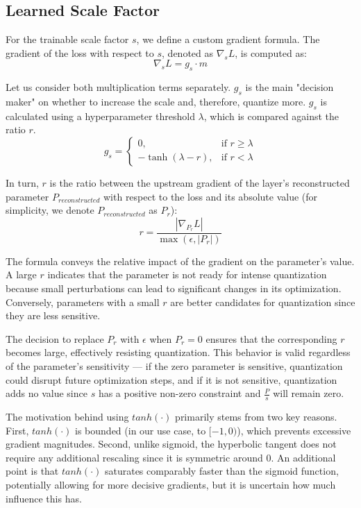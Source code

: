 \subsection{Learned Scale Factor}
\label{subsec:learnedscalefactor}

\hspace*{1em}For the trainable scale factor \( s \), we define a custom gradient formula. 
The gradient of the loss with respect to \( s \), denoted as \( \nabla_s L \), is computed as:
\[
\nabla_s L = g_s \cdot m
\]

Let us consider both multiplication terms separately. \(  g_s  \) is the main "decision maker" on whether to
increase the scale and, therefore, quantize more. \(  g_s  \) is
calculated using a hyperparameter threshold  \(  \lambda  \),
which is compared against the ratio \(  r  \).
\[
g_s = 
\begin{cases} 
0, & \text{if } r \geq \lambda \\
- \tanh(\lambda - r), & \text{if } r < \lambda
\end{cases}
\]

In turn, \(  r  \) is the ratio between the upstream gradient of the layer's reconstructed parameter \( P_{reconstructed}\) 
with respect to the loss
and its absolute value (for simplicity, we denote \( P_{reconstructed}\) as \(P_r\)):
\[
r = \frac{\left| \nabla_{P_{r}} L \right|}{\max(\epsilon, \left| P_r \right|)}
\]

The formula conveys the relative impact of the gradient on the parameter's value.
A large \(  r  \) indicates that the parameter is not ready for intense quantization
because small perturbations can lead to significant changes in its optimization.
Conversely, parameters with a small \(  r  \) are better candidates
for quantization since they are less sensitive.

The decision to replace \( P_r \) with \( \epsilon \) when \( P_r = 0 \)
ensures that the corresponding \( r \) becomes large,
effectively resisting quantization. This behavior is valid regardless of the parameter's sensitivity
 — if the zero parameter is sensitive, quantization could disrupt future optimization steps,
 and if it is not sensitive, quantization adds no value since \( s \) has a positive non-zero constraint 
 and \( \frac{P}{s} \) will remain zero.

The motivation behind using \( tanh(\cdot) \) primarily stems from two key reasons. 
First, \( tanh(\cdot) \) is bounded (in our use case, to \( [-1, 0) \)), 
which prevents excessive gradient magnitudes.
Second, unlike sigmoid, the hyperbolic tangent does not require any additional rescaling since it is
symmetric around \( 0 \). An additional point is that \( tanh(\cdot) \) saturates comparably faster than the sigmoid function,
potentially allowing for more decisive gradients,
but it is uncertain how much influence this has.

